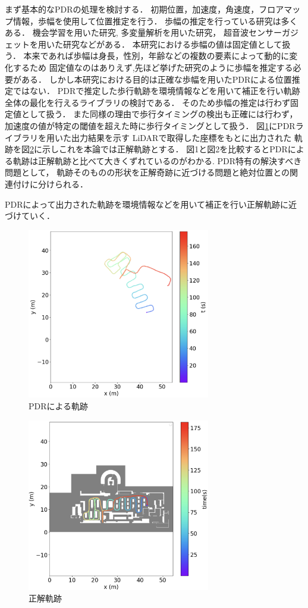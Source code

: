 \documentclass[Japanese]{dicomopapers}
\begin{document}
まず基本的なPDRの処理を検討する．
初期位置，加速度，角速度，フロアマップ情報，歩幅を使用して位置推定を行う．
歩幅の推定を行っている研究は多くある．
機会学習を用いた研究\cite{stride-length-auto-learning},
多変量解析を用いた研究\cite{stride-length-multi}，
超音波センサーガジェットを用いた研究\cite{stride-length-ultrasonic}などがある．
本研究における歩幅の値は固定値として扱う．
本来であれば歩幅は身長，性別，年齢などの複数の要素によって動的に変化するため
固定値なのはありえず,先ほど挙げた研究のように歩幅を推定する必要がある．
しかし本研究における目的は正確な歩幅を用いたPDRによる位置推定ではない．
PDRで推定した歩行軌跡を環境情報などを用いて補正を行い軌跡全体の最化を行えるライブラリの検討である．
そのため歩幅の推定は行わず固定値として扱う．
また同様の理由で歩行タイミングの検出も正確には行わず，加速度の値が特定の閾値を超えた時に歩行タイミングとして扱う．
図\ref{fig:pdr-trajectory}にPDRライブラリを用いた出力結果を示す
LiDARで取得した座標をもとに出力された
軌跡を図\ref{fig:gt-trajectory}に示しこれを本論では正解軌跡とする．
図1と図2を比較するとPDRによる軌跡は正解軌跡と比べて大きくずれているのがわかる.
PDR特有の解決すべき問題として，
軌跡そのものの形状を正解奇跡に近づける問題と絶対位置との関連付けに分けられる．


PDRによって出力された軌跡を環境情報などを用いて補正を行い正解軌跡に近づけていく．

\begin{figure}[h]
	\centering
	\includegraphics[width=80mm]{image/pdr.jpg}
	\caption{PDRによる軌跡}    \label{fig:pdr-trajectory}
\end{figure}

\begin{figure}[h]
	\centering
	\includegraphics[width=80mm]{image/gt.jpg}
	\caption{正解軌跡}    \label{fig:gt-trajectory}
\end{figure}
\end{document}
